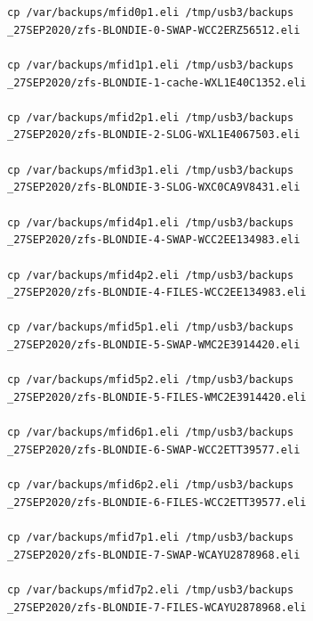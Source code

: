 \noindent\texttt{cp /var/backups/mfid0p1.eli /tmp/usb3/backups\\\_27SEP2020/\gls{zfs}-BLONDIE-0-SWAP-WCC2ERZ56512.eli}\\\\
\texttt{cp /var/backups/mfid1p1.eli /tmp/usb3/backups\\\_27SEP2020/\gls{zfs}-BLONDIE-1-\gls{cache}-WXL1E40C1352.eli}\\\\
\texttt{cp /var/backups/mfid2p1.eli /tmp/usb3/backups\\\_27SEP2020/\gls{zfs}-BLONDIE-2-SLOG-WXL1E4067503.eli}\\\\
\texttt{cp /var/backups/mfid3p1.eli /tmp/usb3/backups\\\_27SEP2020/\gls{zfs}-BLONDIE-3-SLOG-WXC0CA9V8431.eli}\\\\
\texttt{cp /var/backups/mfid4p1.eli /tmp/usb3/backups\\\_27SEP2020/\gls{zfs}-BLONDIE-4-SWAP-WCC2EE134983.eli}\\\\
\texttt{cp /var/backups/mfid4p2.eli /tmp/usb3/backups\\\_27SEP2020/\gls{zfs}-BLONDIE-4-FILES-WCC2EE134983.eli}\\\\
\texttt{cp /var/backups/mfid5p1.eli /tmp/usb3/backups\\\_27SEP2020/\gls{zfs}-BLONDIE-5-SWAP-WMC2E3914420.eli}\\\\
\texttt{cp /var/backups/mfid5p2.eli /tmp/usb3/backups\\\_27SEP2020/\gls{zfs}-BLONDIE-5-FILES-WMC2E3914420.eli}\\\\
\texttt{cp /var/backups/mfid6p1.eli /tmp/usb3/backups\\\_27SEP2020/\gls{zfs}-BLONDIE-6-SWAP-WCC2ETT39577.eli}\\\\
\texttt{cp /var/backups/mfid6p2.eli /tmp/usb3/backups\\\_27SEP2020/\gls{zfs}-BLONDIE-6-FILES-WCC2ETT39577.eli}\\\\
\texttt{cp /var/backups/mfid7p1.eli /tmp/usb3/backups\\\_27SEP2020/\gls{zfs}-BLONDIE-7-SWAP-WCAYU2878968.eli}\\\\
\texttt{cp /var/backups/mfid7p2.eli /tmp/usb3/backups\\\_27SEP2020/\gls{zfs}-BLONDIE-7-FILES-WCAYU2878968.eli}


